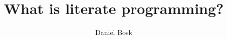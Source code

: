 \documentclass[a4paper,10pt,article,oneside,oldfontcommands]{memoir}
\begin{document}
\title{%
  What is literate programming?
}
\author{%
  Daniel Bosk
}


\begin{frame}
  \maketitle
\end{frame}

\begin{abstract}
  
\end{abstract}

\clearpage

\begin{frame}
\end{frame}

\clearpage


\end{document}
